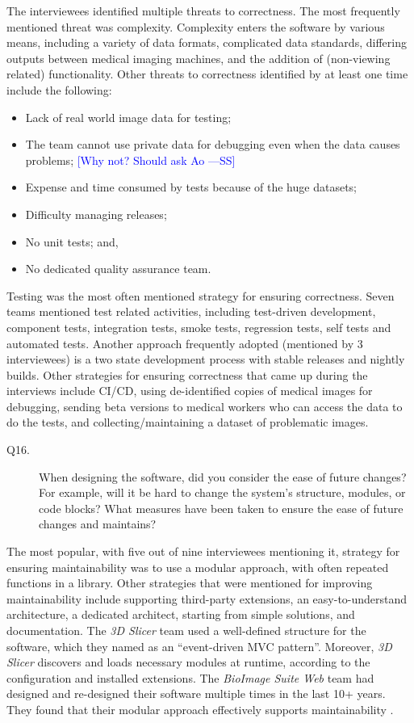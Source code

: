 \documentclass[final, 3p, times, authoryear]{elsarticle}
\newcommand{\authornote}[3]{\textcolor{#1}{[#3 ---#2]}}
\newcommand{\authornote}[3]{}
\newcommand{\wss}[1]{\authornote{blue}{SS}{#1}} %
\begin{document}
The interviewees identified multiple threats to correctness.  The most
frequently mentioned threat was complexity.  Complexity enters the software by
various means, including a variety of data formats, complicated data standards,
differing outputs between medical imaging machines, and the addition of
(non-viewing related) functionality.  Other threats to correctness identified by at least one time
include the following:
\begin{itemize}
\item Lack of real world image data for testing;
\item The team cannot use private data for debugging even when the data causes
problems; \wss{Why not?  Should ask Ao}
\item Expense and time consumed by tests because of the huge datasets;
\item Difficulty managing releases;
\item No unit tests; and,
\item No dedicated quality assurance team.
\end{itemize}

Testing was the most often mentioned strategy for ensuring correctness.  Seven
teams mentioned test related activities, including test-driven development,
component tests, integration tests, smoke tests, regression tests, self tests
and automated tests.  Another approach frequently adopted (mentioned by 3
interviewees) is a two state development process with stable releases and
nightly builds.  Other strategies for ensuring correctness that came up during
the interviews include CI/CD, using de-identified copies of medical images for
debugging, sending beta versions to medical workers who can access the data to
do the tests, and collecting/maintaining a dataset of problematic images.

\begin{description}
\item[Q16.] When designing the software, did you consider the ease of future
changes? For example, will it be hard to change the system’s structure, modules,
or code blocks? What measures have been taken to ensure the ease of future
changes and maintains?
\end{description}

The most popular, with five out of nine interviewees mentioning it, strategy for
ensuring maintainability was to use a modular approach, with often repeated
functions in a library.  Other strategies that were mentioned for improving
maintainability include supporting third-party extensions, an easy-to-understand
architecture, a dedicated architect, starting from simple solutions, and
documentation.  The \textit{3D Slicer} team used a well-defined structure for
the software, which they named as an ``event-driven MVC pattern''. Moreover,
\textit{3D Slicer} discovers and loads necessary modules at runtime, according
to the configuration and installed extensions. The \textit{BioImage Suite Web}
team had designed and re-designed their software multiple times in the last 10+
years. They found that their modular approach effectively supports
maintainability \citep{Joshi2011}. 
\end{document}
